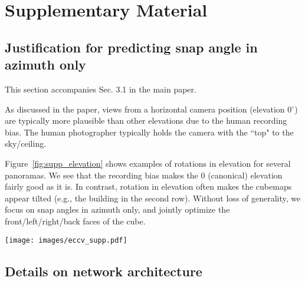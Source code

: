 \section{Supplementary Material}







\subsection{Justification for predicting snap angle in azimuth only}

This section accompanies Sec. 3.1 in the main paper.

As discussed in the paper, views from a horizontal camera position (elevation 0$^{\circ}$) are typically more plausible than other elevations due to the human recording bias.  The human photographer typically holds the camera with the ``top" to the sky/ceiling.  

Figure~\ref{fig:supp_elevation} shows examples of rotations in elevation for several panoramas.
We see that the recording bias makes the 0 (canonical) elevation fairly good as it is.  In contrast, rotation in elevation often makes the cubemaps appear tilted (e.g., the building in the second row). Without loss of generality, we focus on snap angles in azimuth only, and jointly
optimize the front/left/right/back faces of the cube.






\begin{figure*}[t!]
\centering
\renewcommand{\tabcolsep}{0pt}
\texttt{[image: images/eccv\_supp.pdf]}%

\caption{Example of cubemaps when rotating in elevation. Views from a horizontal camera position (elevation 0$^{\circ}$) are more informative than others due to the natural human recording bias. In addition, rotation in elevation often makes cubemap faces appear tilted (e.g., building in the second row).  Therefore, we optimize for the azimuth snap angle only.}
\label{fig:supp_elevation}
\end{figure*}







\subsection{Details on network architecture}

